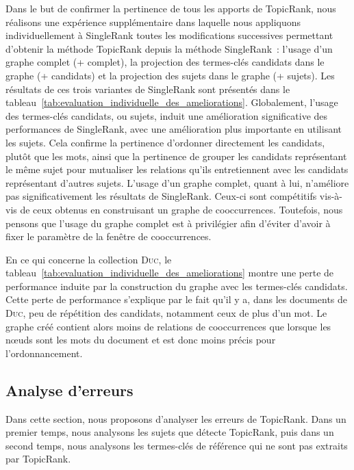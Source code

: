         Dans le but de confirmer la pertinence de tous les apports de TopicRank,
        nous réalisons une expérience supplémentaire dans laquelle nous
        appliquons individuellement à SingleRank toutes les modifications
        successives permettant d'obtenir la méthode TopicRank depuis la méthode
        SingleRank~: l'usage d'un graphe complet (+ complet), la projection des
        termes-clés candidats dans le graphe (+ candidats) et la projection des
        sujets dans le graphe (+ sujets). Les résultats de ces trois variantes
        de SingleRank sont présentés dans le
        tableau~\ref{tab:evaluation_individuelle_des_ameliorations}.
        Globalement, l'usage des termes-clés candidats, ou sujets, induit une
        amélioration significative des performances de SingleRank, avec une
        amélioration plus importante en utilisant les sujets. Cela confirme la
        pertinence d'ordonner directement les candidats, plutôt que les mots,
        ainsi que la pertinence de grouper les candidats représentant le même
        sujet pour mutualiser les relations qu'ils entretiennent avec les
        candidats représentant d'autres sujets. L'usage d'un graphe complet,
        quant à lui, n'améliore pas significativement les résultats de
        SingleRank. Ceux-ci sont compétitifs vis-à-vis de ceux obtenus en
        construisant un graphe de cooccurrences. Toutefois, nous pensons que
        l'usage du graphe complet est à privilégier afin d'éviter d'avoir à
        fixer le paramètre de la fenêtre de cooccurrences.
        
        En ce qui concerne la collection \textsc{Duc}, le
        tableau~\ref{tab:evaluation_individuelle_des_ameliorations} montre une
        perte de performance induite par la construction du graphe avec les
        termes-clés candidats. Cette perte de performance s'explique par le fait
        qu'il y a, dans les documents de \textsc{Duc}, peu de répétition des
        candidats, notamment ceux de plus d'un mot. Le graphe créé contient
        alors moins de relations de cooccurrences que lorsque les n\oe{}uds sont
        les mots du document et est donc moins précis pour l'ordonnancement.

      \subsection{Analyse d'erreurs}
      \label{subsec:main-automatic_keyphrase_annotation-unsupervised_automatic_keyphrase_extraction-error_analysis}
        Dans cette section, nous proposons d'analyser les erreurs de TopicRank.
        Dans un premier temps, nous analysons les sujets que détecte TopicRank,
        puis dans un second temps, nous analysons les termes-clés de référence
        qui ne sont pas extraits par Topic\-Rank.

